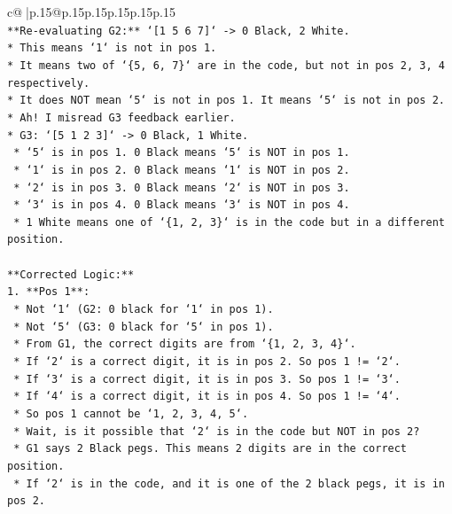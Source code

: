 \documentclass{article}
\begin{document}
{\begin{supertabular}{c@{$\;$}|p{.15\linewidth}@{}p{.15\linewidth}p{.15\linewidth}p{.15\linewidth}p{.15\linewidth}p{.15\linewidth}}
{{{\\ 
\texttt{**Re{-}evaluating G2:** `{[}1 5 6 7{]}` {-}> 0 Black, 2 White.} \\
\texttt{*   This means `1` is not in pos 1.} \\
\texttt{*   It means two of `\{5, 6, 7\}` are in the code, but not in pos 2, 3, 4 respectively.} \\
\texttt{*   It does NOT mean `5` is not in pos 1. It means `5` is not in pos 2.} \\
\texttt{*   Ah! I misread G3 feedback earlier.} \\
\texttt{*   G3: `{[}5 1 2 3{]}` {-}> 0 Black, 1 White.} \\
\texttt{    *   `5` is in pos 1. 0 Black means `5` is NOT in pos 1.} \\
\texttt{    *   `1` is in pos 2. 0 Black means `1` is NOT in pos 2.} \\
\texttt{    *   `2` is in pos 3. 0 Black means `2` is NOT in pos 3.} \\
\texttt{    *   `3` is in pos 4. 0 Black means `3` is NOT in pos 4.} \\
\texttt{    *   1 White means one of `\{1, 2, 3\}` is in the code but in a different position.} \\
\\ 
\texttt{**Corrected Logic:**} \\
\texttt{1.  **Pos 1**:} \\
\texttt{    *   Not `1` (G2: 0 black for `1` in pos 1).} \\
\texttt{    *   Not `5` (G3: 0 black for `5` in pos 1).} \\
\texttt{    *   From G1, the correct digits are from `\{1, 2, 3, 4\}`.} \\
\texttt{    *   If `2` is a correct digit, it is in pos 2. So pos 1 != `2`.} \\
\texttt{    *   If `3` is a correct digit, it is in pos 3. So pos 1 != `3`.} \\
\texttt{    *   If `4` is a correct digit, it is in pos 4. So pos 1 != `4`.} \\
\texttt{    *   So pos 1 cannot be `1, 2, 3, 4, 5`.} \\
\texttt{    *   Wait, is it possible that `2` is in the code but NOT in pos 2?} \\
\texttt{        *   G1 says 2 Black pegs. This means 2 digits are in the correct position.} \\
\texttt{        *   If `2` is in the code, and it is one of the 2 black pegs, it is in pos 2.} \\
}}}
\end{supertabular}}
\end{document}
